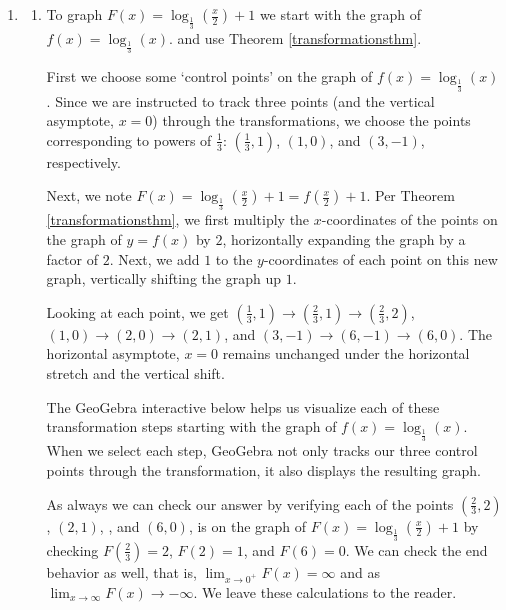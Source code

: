 \documentclass{ximera}
\begin{document}
\begin{example}
\begin{explanation}
\begin{enumerate}
\item

\begin{enumerate}

\item  To graph $F(x) = \log_{\frac{1}{3}} \left( \frac{x}{2} \right) + 1$  we start with the graph of  $f(x) = \log_{\frac{1}{3}}(x)$.  and use Theorem  \ref{transformationsthm}.


First we choose some `control points' on the graph of  $f(x) = \log_{\frac{1}{3}}(x)$.  Since we are instructed to track three points (and the vertical asymptote, $x = 0$) through the transformations, we choose the points corresponding  to powers of $\frac{1}{3}$:  $\left( \frac{1}{3}, 1 \right)$, $(1,0)$, and $(3, -1)$,  respectively.   


Next, we note $F(x) = \log_{\frac{1}{3}} \left( \frac{x}{2} \right) + 1 = f \left(\frac{x}{2}\right) + 1$.   Per Theorem  \ref{transformationsthm}, we first multiply the $x$-coordinates of the points on the graph of $y = f(x)$ by $2$, horizontally expanding the graph by a factor of $2$.   Next, we add $1$ to the $y$-coordinates of each point on this new graph, vertically shifting the graph up $1$.  


Looking at each point, we  get  $\left( \frac{1}{3}, 1 \right) \rightarrow \left( \frac{2}{3}, 1 \right) \rightarrow \left( \frac{2}{3}, 2 \right)$, $(1,0) \rightarrow (2,0) \rightarrow (2,1)$, and $(3,-1) \rightarrow  (6,-1) \rightarrow  (6,0)$.  The horizontal asymptote, $x = 0$ remains unchanged under the horizontal stretch and the vertical shift.   


The GeoGebra interactive below helps us visualize each of these transformation steps starting with the graph of $f(x) =  \log_{\frac{1}{3}}(x)$. When we select each step, GeoGebra not only tracks our three control points through the transformation, it also displays the resulting graph. 


\begin{center}
\end{center}

As always we can check our answer by verifying each of the points $\left(\frac{2}{3}, 2\right)$, $(2,1)$, , and  $(6,0)$,  is on the graph of $F(x) =  \log_{\frac{1}{3}} \left( \frac{x}{2} \right) + 1$ by checking $F\left( \frac{2}{3} \right) = 2$, $F(2) = 1$, and $F(6) = 0$.  We can check the end behavior as well, that is, $\lim_{x \rightarrow 0^{+}} F(x) = \infty$ and as $\lim_{x \rightarrow \infty} F(x) \rightarrow -\infty$.  We leave these calculations to the reader.



\end{enumerate}
\end{enumerate}
\end{explanation}
\end{example}
\end{document}
